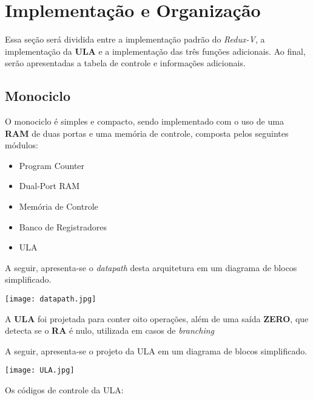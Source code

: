 \documentclass{article}  %
\begin{document}
    \clearpage
    \section{Implementação e Organização}

    Essa seção será dividida entre a implementação padrão do \textit{Redux-V}, a implementação da \textbf{ULA} e a implementação das três funções adicionais. Ao final, serão apresentadas a tabela de controle e informações adicionais.

    \subsection{Monociclo}

    O monociclo é simples e compacto, sendo implementado com o uso de uma \textbf{RAM} de duas portas e uma memória de controle, composta pelos seguintes módulos:

    \begin{itemize}
      \item Program Counter
      \item Dual-Port RAM
      \item Memória de Controle
      \item Banco de Registradores
      \item ULA
    \end{itemize}

    A seguir, apresenta-se o \textit{datapath} desta arquitetura em um diagrama de blocos simplificado.

    \vspace{1cm}
    \noindent\hspace*{-4cm}\texttt{[image: datapath.jpg]}
    \vspace{1cm}

    A \textbf{ULA} foi projetada para conter oito operações, além de uma saída \textbf{ZERO}, que detecta se o \textbf{RA} é nulo, utilizada em casos de \textit{branching}

    A seguir, apresenta-se o projeto da ULA em um diagrama de blocos simplificado.
    
    \vspace{1cm}
    \noindent\hspace*{2cm}\texttt{[image: ULA.jpg]}
    \vspace{3cm}

    Os códigos de controle da ULA:
\end{document}
